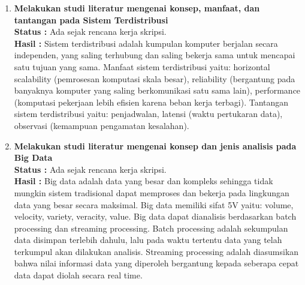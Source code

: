 \documentclass[a4paper,twoside]{article}
\begin{document}
\begin{enumerate}
\item \textbf{Melakukan studi literatur mengenai konsep, manfaat, dan tantangan pada Sistem Terdistribusi}\\
		{\bf Status :} Ada sejak rencana kerja skripsi.\\
		{\bf Hasil :}  Sistem terdistribusi adalah kumpulan komputer berjalan secara independen, yang saling terhubung dan saling bekerja sama untuk mencapai satu tujuan yang sama. Manfaat sistem terdistribusi yaitu: horizontal scalability (pemrosesan komputasi skala besar), reliability (bergantung pada banyaknya komputer yang saling berkomunikasi satu sama lain), performance (komputasi pekerjaan lebih efisien karena beban kerja terbagi). Tantangan sistem terdistribusi yaitu: penjadwalan, latensi (waktu pertukaran data), observasi (kemampuan pengamatan kesalahan).

\newpage
\item \textbf{Melakukan studi literatur mengenai konsep dan jenis analisis pada Big Data}\\
		{\bf Status :} Ada sejak rencana kerja skripsi.\\
		{\bf Hasil :} Big data adalah data yang besar dan kompleks sehingga tidak mungkin sistem tradisional dapat memproses dan bekerja pada lingkungan data yang besar secara maksimal. Big data memiliki sifat 5V yaitu: volume, velocity, variety, veracity, value. Big data dapat dianalisis berdasarkan batch processing dan streaming processing. Batch processing adalah sekumpulan data disimpan terlebih dahulu, lalu pada waktu tertentu data yang telah terkumpul akan dilakukan analisis. Streaming processing adalah diasumsikan bahwa nilai informasi data yang diperoleh bergantung kepada seberapa cepat data dapat diolah secara real time.
		

\end{enumerate}
\end{document}

